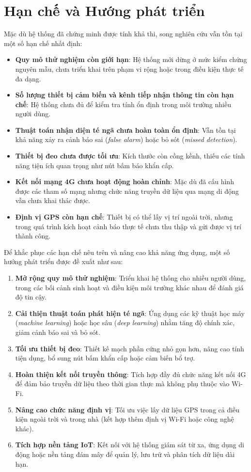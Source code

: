 
\section{Hạn chế và Hướng phát triển}
\label{sec:limitation_future_work}

Mặc dù hệ thống đã chứng minh được tính khả thi, song nghiên cứu vẫn tồn tại một số hạn chế nhất định:

\begin{itemize}
    \item \textbf{Quy mô thử nghiệm còn giới hạn}: Hệ thống mới dừng ở mức kiểm chứng nguyên mẫu, chưa triển khai trên phạm vi rộng hoặc trong điều kiện thực tế đa dạng.
    \item \textbf{Số lượng thiết bị cảm biến và kênh tiếp nhận thông tin còn hạn chế}: Hệ thống chưa đủ để kiểm tra tính ổn định trong môi trường nhiều người dùng.
    \item \textbf{Thuật toán nhận diện té ngã chưa hoàn toàn ổn định}: Vẫn tồn tại khả năng xảy ra cảnh báo sai (\textit{false alarm}) hoặc bỏ sót (\textit{missed detection}).
    \item \textbf{Thiết bị đeo chưa được tối ưu}: Kích thước còn cồng kềnh, thiếu các tính năng tiện ích quan trọng như nút bấm báo khẩn cấp.
    \item \textbf{Kết nối mạng 4G chưa hoạt động hoàn chỉnh}: Mặc dù đã cấu hình được các tham số mạng nhưng chức năng truyền dữ liệu qua mạng di động vẫn chưa khai thác được.
    \item \textbf{Định vị GPS còn hạn chế}: Thiết bị có thể lấy vị trí ngoài trời, nhưng trong quá trình kích hoạt cảnh báo thực tế chưa thu thập và gửi được vị trí thành công.
\end{itemize}

Để khắc phục các hạn chế nêu trên và nâng cao khả năng ứng dụng, một số hướng phát triển được đề xuất như sau:

\begin{enumerate}
    \item \textbf{Mở rộng quy mô thử nghiệm}: Triển khai hệ thống cho nhiều người dùng, trong các bối cảnh sinh hoạt và điều kiện môi trường khác nhau để đánh giá độ tin cậy.
    \item \textbf{Cải thiện thuật toán phát hiện té ngã}: Ứng dụng các kỹ thuật học máy (\textit{machine learning}) hoặc học sâu (\textit{deep learning}) nhằm tăng độ chính xác, giảm cảnh báo sai và bỏ sót.
    \item \textbf{Tối ưu thiết bị đeo}: Thiết kế mạch phần cứng nhỏ gọn hơn, nâng cao tính tiện dụng, bổ sung nút bấm khẩn cấp hoặc cảm biến bổ trợ.
    \item \textbf{Hoàn thiện kết nối truyền thông}: Tích hợp đầy đủ chức năng kết nối 4G để đảm bảo truyền dữ liệu theo thời gian thực mà không phụ thuộc vào Wi-Fi.
    \item \textbf{Nâng cao chức năng định vị}: Tối ưu việc lấy dữ liệu GPS trong cả điều kiện ngoài trời và trong nhà (kết hợp thêm định vị Wi-Fi hoặc công nghệ khác).
    \item \textbf{Tích hợp nền tảng IoT}: Kết nối với hệ thống giám sát từ xa, ứng dụng di động hoặc nền tảng đám mây để quản lý, lưu trữ và phân tích dữ liệu dài hạn.
\end{enumerate}
